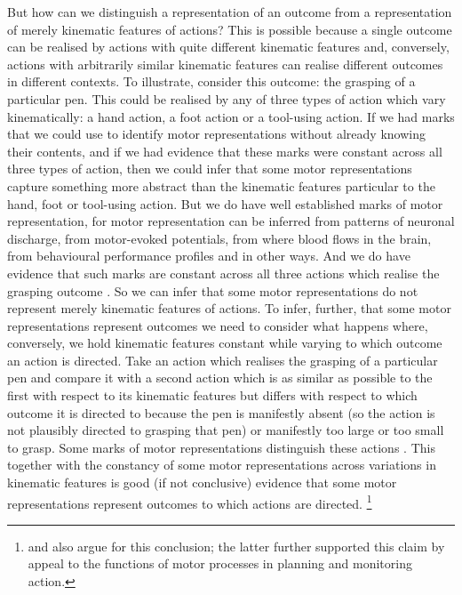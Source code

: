 \documentclass[12pt,\papersize]{extarticle}
\begin{document}
But how can we distinguish a representation of an outcome from a representation of merely kinematic features of actions?  This is possible because a single outcome can be realised by actions with quite different kinematic features and, conversely, actions with arbitrarily similar kinematic features can realise different outcomes in different contexts.  To illustrate, consider this outcome: the grasping of a particular pen. This could be realised by any of three types of action which vary kinematically: a hand action, a foot action or a tool-using action.  If we had marks that we could use to identify motor representations without already knowing their contents, and if we had evidence that these marks were constant across all three types of action, then we could infer that some motor representations capture something more abstract than the kinematic features particular to the hand, foot or tool-using action. But we do have well established marks of motor representation, for motor representation can be inferred from patterns of neuronal discharge, from motor-evoked potentials, from where blood flows in the brain, from behavioural performance profiles and in other ways.  And we do have evidence that such marks are constant across all three actions which realise the grasping outcome \citep{rizzolatti:1988_functional, Rizzolatti:2001ug, cattaneo:2010_state-dependent}. So we can infer that some motor representations do not represent merely kinematic features of actions. To infer, further, that some motor representations represent outcomes we need to consider what happens where, conversely, we hold kinematic features constant while varying to which outcome an action is directed. Take an action which realises the grasping of a particular pen and compare it with a second action which is as similar as possible to the first with respect to its kinematic features but differs with respect to which outcome it is directed to because the pen is manifestly absent (so the action is not plausibly directed to grasping that pen) or manifestly too large or too small to grasp.  Some marks of motor representations distinguish these actions \citep{Umilta:2001zr, villiger:2010_activity, koch:2010_resonance}.  This together with the constancy of some motor representations across variations in kinematic features is good (if not conclusive) evidence that some motor representations represent outcomes to which actions are directed.%
\footnote{
\citet{pacherie:2008_action} and \citet{butterfill:2012_intention} also argue for this conclusion; the latter further supported this claim by appeal to the functions of motor processes in planning and monitoring action.
}
\end{document}
